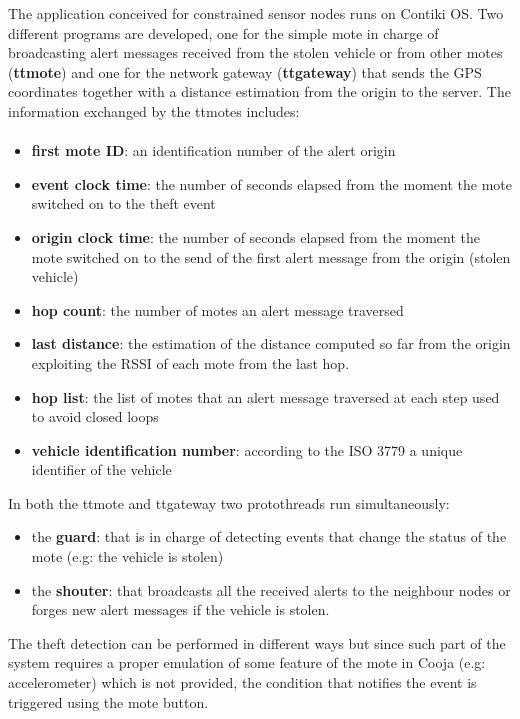 \documentclass[]{article}
\begin{document}
The application conceived for constrained sensor nodes runs on Contiki OS. Two different programs are developed, one for the simple mote in charge of broadcasting alert messages received from the stolen vehicle or from other motes (\textbf{ttmote}) and one for the network gateway (\textbf{ttgateway}) that sends the GPS coordinates together with a distance estimation from the origin to the server. The information exchanged by the ttmotes includes:
\newpage
\paragraph{}
\begin{itemize}
	\item \textbf{first mote ID}: an identification number of the alert origin
	\item \textbf{event clock time}: the number of seconds elapsed from the moment the mote switched on to the theft event 
	\item \textbf{origin clock time}: the number of seconds elapsed from the moment the mote switched on to the send of the first alert message from the origin (stolen vehicle) 
	\item\textbf{hop count}: the number of motes an alert message traversed
	\item \textbf{last distance}: the estimation of the distance computed so far from the origin exploiting the RSSI of each mote from the last hop.
	\item \textbf{hop list}: the list of motes that an alert message traversed at each step used to avoid closed loops
	\item \textbf{vehicle identification number}: according to the ISO 3779 a unique identifier of the vehicle
\end{itemize}
In both the ttmote and ttgateway two protothreads run simultaneously:
\begin{itemize}
	\item the \textbf{guard}: that is in charge of detecting events that change the status of the mote (e.g: the vehicle is stolen)
	\item the \textbf{shouter}: that broadcasts all the received alerts to the neighbour nodes or forges new alert messages if the vehicle is stolen.
\end{itemize}
The theft detection can be performed in different ways but since such part of the system requires a proper emulation of some feature of the mote in Cooja (e.g: accelerometer) which is not provided, the condition that notifies the event is triggered using the mote button.\par 
\end{document}
